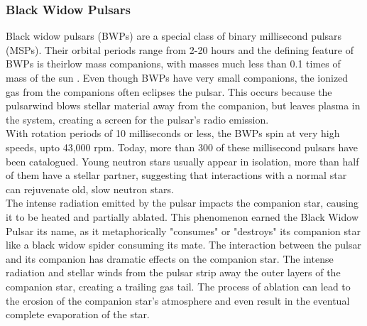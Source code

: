 \newpage
\subsubsection{Black Widow Pulsars}

Black widow pulsars (BWPs) are a special class of binary millisecond pulsars (MSPs). Their orbital periods range from 2-20 hours \cite{Formation_BWP_Chen_2013} and  the defining feature of BWPs is theirlow mass companions, with masses much less than 0.1 times of mass of the sun \cite{Bochenek_2015}. Even though BWPs have very small companions, the ionized gas from the companions often eclipses the pulsar. This occurs because the pulsarwind blows stellar material away from the companion, but leaves plasma in the system, creating a screen for the pulsar’s radio emission\cite{Bochenek_2015}.\\

With rotation periods of 10 milliseconds or less, the BWPs spin at very high speeds, upto 43,000 rpm. Today, more than 300 of these millisecond pulsars have been catalogued. Young neutron stars usually appear in isolation, more than half of them have a stellar partner, suggesting that interactions with a normal star can rejuvenate old, slow neutron stars.\\

The intense radiation emitted by the pulsar impacts the companion star, causing it to be heated and partially ablated. This phenomenon earned the Black Widow Pulsar its name, as it metaphorically "consumes" or "destroys" its companion star like a black widow spider consuming its mate. The interaction between the pulsar and its companion has dramatic effects on the companion star. The intense radiation and stellar winds from the pulsar strip away the outer layers of the companion star, creating a trailing gas tail. The process of ablation can lead to the erosion of the companion star's atmosphere and even result in the eventual complete evaporation of the star.

